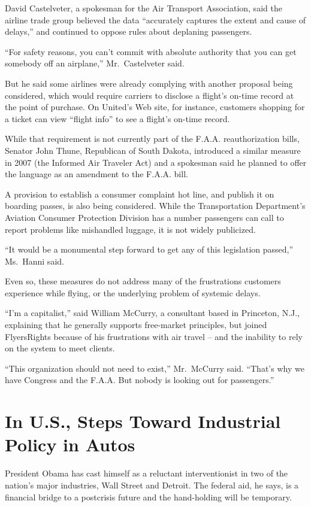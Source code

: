 \documentclass[12pt,a4paper,onecolumn]{article}
\begin{document}
David Castelveter, a spokesman for the Air Transport Association, said the airline trade group
believed the data ``accurately captures the extent and cause of delays,'' and continued to oppose
rules about deplaning passengers.

``For safety reasons, you can't commit with absolute authority that you can get somebody off an
airplane,'' Mr.~Castelveter said.

But he said some airlines were already complying with another proposal being considered, which would
require carriers to disclose a flight's on-time record at the point of purchase. On United's Web
site, for instance, customers shopping for a ticket can view ``flight info'' to see a flight's
on-time record.

While that requirement is not currently part of the F.A.A. reauthorization bills, Senator John
Thune, Republican of South Dakota, introduced a similar measure in 2007 (the Informed Air Traveler
Act) and a spokesman said he planned to offer the language as an amendment to the F.A.A. bill.

A provision to establish a consumer complaint hot line, and publish it on boarding passes, is also
being considered. While the Transportation Department's Aviation Consumer Protection Division has a
number passengers can call to report problems like mishandled luggage, it is not widely publicized.

``It would be a monumental step forward to get any of this legislation passed,'' Ms.~Hanni said.

Even so, these measures do not address many of the frustrations customers experience while flying,
or the underlying problem of systemic delays.

``I'm a capitalist,'' said William McCurry, a consultant based in Princeton, N.J., explaining that
he generally supports free-market principles, but joined FlyersRights because of his frustrations
with air travel -- and the inability to rely on the system to meet clients.

``This organization should not need to exist,'' Mr.~McCurry said. ``That's why we have Congress and
the F.A.A. But nobody is looking out for passengers.''

\section{In U.S., Steps Toward Industrial Policy in Autos}

President Obama has cast himself as a reluctant interventionist in two of the nation's major
industries, Wall Street and Detroit. The federal aid, he says, is a financial bridge to a postcrisis
future and the hand-holding will be temporary.
\end{document}
